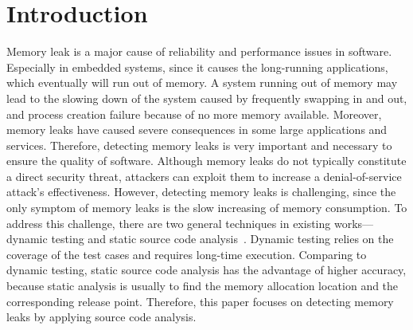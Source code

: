 \section{Introduction}\label{sec:intro}
Memory leak is a major cause of reliability and performance issues in software. Especially in embedded systems, since it causes the long-running applications, which eventually will run out of memory. 
A system running out of memory may lead to the slowing down of the system caused by frequently swapping in and out, and process creation failure because of no more memory available. Moreover, memory leaks have caused severe consequences in some large applications and services. 
Therefore, detecting memory leaks is very important and necessary to ensure the quality of software. Although memory leaks do not typically constitute a direct security threat, attackers can exploit them to increase a denial-of-service attack’s effectiveness.
However, detecting memory leaks is challenging, since the only symptom of memory leaks is the slow increasing of memory consumption.  
To address this challenge, there are two general techniques in existing works---dynamic testing and static source code analysis~\cite{AJ06}. 
Dynamic testing relies on the coverage of the test cases and requires long-time execution. Comparing to dynamic testing, static source code analysis has the advantage of higher accuracy, because static analysis is usually to find the memory allocation location and the corresponding release point.
Therefore, this paper focuses on detecting memory leaks by applying source code analysis.

